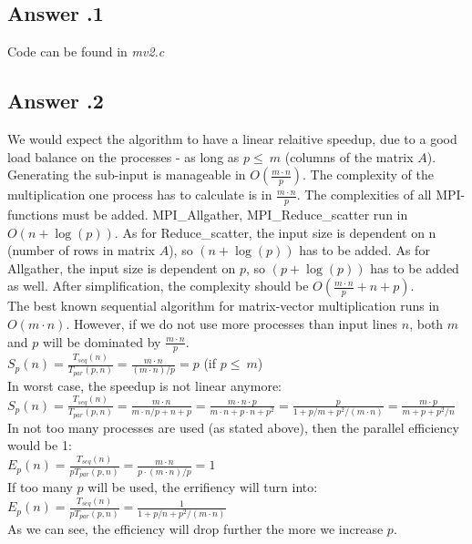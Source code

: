 \documentclass[a4paper,%
11pt,%
DIV=12,
headsepline,%
headings=normal,
]{scrartcl}
\newcounter{curex}
\newcommand{\answer}[1]{\subsection*{Answer \arabic{curex}.#1}}
\begin{document}
\answer{1}
Code can be found in \textit{mv2.c}
\answer{2}
We would expect the algorithm to have a linear relaitive speedup, due to a good load balance on the processes - as long as $p \leq\ m$  (columns of the matrix $A$). Generating the sub-input is manageable in $O\left(\frac{m \cdot n}{p}\right)$. The complexity of the multiplication one process has to calculate is in $\frac{m \cdot n}{p}$. The complexities of all MPI-functions must be added. MPI\_Allgather,  MPI\_Reduce\_scatter run in $O(n + \log(p))$. As for Reduce\_scatter, the input size is dependent on n (number of rows in matrix $A$), so $(n + \log(p))$ has to be added. As for Allgather, the input size is dependent on $p$, so $(p + \log(p))$ has to be added as well. After simplification, the complexity should be $O\left(\frac{m \cdot n}{p} + n + p\right)$.\\
\newpage
\noindent The best known sequential algorithm for matrix-vector multiplication runs in $O(m \cdot n)$. However, if we do not use more processes than input lines $n$, both $m$ and $p$ will be dominated by $\frac{m \cdot n}{p}$.\\
$\displaystyle S_{p}(n)=\frac{T_{seq}(n)}{T_{par}(p,n)} = \frac{m \cdot n}{(m \cdot n)/p } = p$ (if $p \leq\ m$)
\\[0.5 em]
In worst case, the speedup is not linear anymore:
\\[0.5 em]
$\displaystyle S_{p}(n)=\frac{T_{seq}(n)}{T_{par}(p,n)} = \frac{m \cdot n}{m \cdot n/p + n + p} = \frac{m \cdot n \cdot p}{m \cdot n + p \cdot  n + p^2} = \frac{p}{1 + p/m + p^2/(m \cdot n)} = \frac{m \cdot p}{m + p + p^2/n}$
\\[0.5 em]
In not too many processes are used (as stated above), then the parallel efficiency would be 1:
\\[0.5 em]
$\displaystyle E_{p}(n)=\frac{T_{seq}(n)}{pT_{par}(p,n)} = \frac{m \cdot n}{p \cdot (m \cdot n)/p} = 1 $
\\[0.5 em]
If too many $p$ will be used, the errifiency will turn into:
\\[0.5 em]
$\displaystyle E_{p}(n)=\frac{T_{seq}(n)}{pT_{par}(p,n)} = \frac{1}{1 + p/n + p^2/(m \cdot n)} $
\\[0.5 em]
As we can see, the efficiency will drop further the more we increase $p$.
\end{document}
